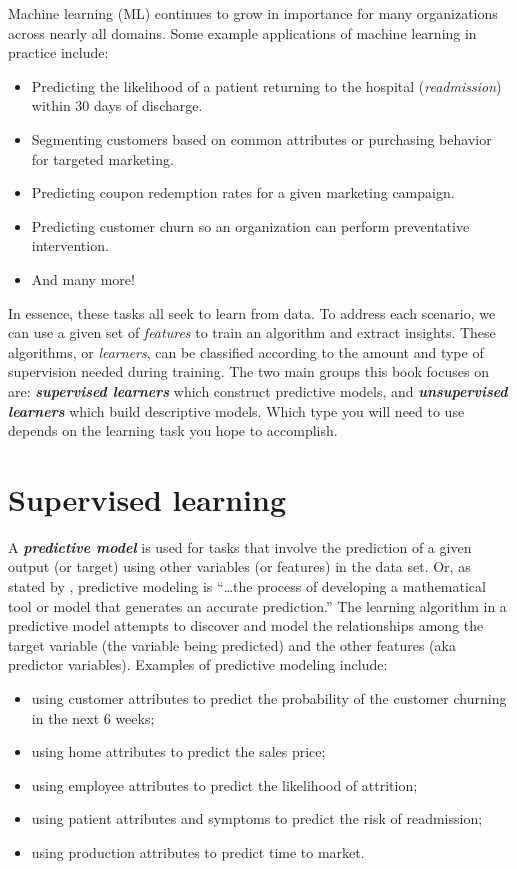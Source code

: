 \documentclass[]{krantz}
\providecommand{\tightlist}{%
  \setlength{\itemsep}{0pt}\setlength{\parskip}{0pt}}
\begin{document}
Machine learning (ML) continues to grow in importance for many organizations across nearly all domains. Some example applications of machine learning in practice include:

\begin{itemize}
\tightlist
\item
  Predicting the likelihood of a patient returning to the hospital (\emph{readmission}) within 30 days of discharge.
\item
  Segmenting customers based on common attributes or purchasing behavior for targeted marketing.
\item
  Predicting coupon redemption rates for a given marketing campaign.
\item
  Predicting customer churn so an organization can perform preventative intervention.
\item
  And many more!
\end{itemize}

In essence, these tasks all seek to learn from data. To address each scenario, we can use a given set of \emph{features} to train an algorithm and extract insights. These algorithms, or \emph{learners}, can be classified according to the amount and type of supervision needed during training. The two main groups this book focuses on are: \textbf{\emph{supervised learners}} which construct predictive models, and \textbf{\emph{unsupervised learners}} which build descriptive models. Which type you will need to use depends on the learning task you hope to accomplish.

\hypertarget{supervised-learning}{%
\section{Supervised learning}\label{supervised-learning}}

A \textbf{\emph{predictive model}} is used for tasks that involve the prediction of a given output (or target) using other variables (or features) in the data set. Or, as stated by \citet[p.~2]{apm}, predictive modeling is ``\ldots{}the process of developing a mathematical tool or model that generates an accurate prediction.'' The learning algorithm in a predictive model attempts to discover and model the relationships among the target variable (the variable being predicted) and the other features (aka predictor variables). Examples of predictive modeling include:

\begin{itemize}
\tightlist
\item
  using customer attributes to predict the probability of the customer churning in the next 6 weeks;
\item
  using home attributes to predict the sales price;
\item
  using employee attributes to predict the likelihood of attrition;
\item
  using patient attributes and symptoms to predict the risk of readmission;
\item
  using production attributes to predict time to market.
\end{itemize}
\end{document}
